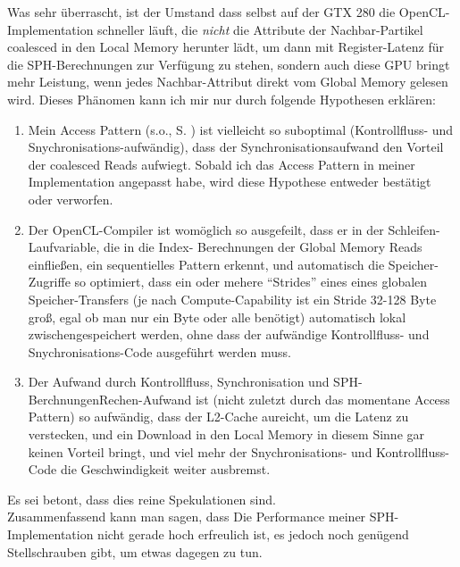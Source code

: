 	Was sehr überrascht, ist der Umstand dass selbst auf der GTX 280 die OpenCL-Implementation schneller läuft, die 
	\emph{nicht} die Attribute der Nachbar-Partikel coalesced in den Local Memory herunter lädt, um dann 
	mit Register-Latenz für die SPH-Berechnungen zur Verfügung zu stehen, sondern auch diese GPU
	bringt mehr Leistung, wenn jedes Nachbar-Attribut direkt vom Global Memory gelesen wird.
	Dieses Phänomen kann ich mir nur durch folgende Hypothesen erklären:
	\begin{enumerate}
		\item Mein Access Pattern (s.o., S. \pageref{enum:goswamiAccessPattern}) ist vielleicht so suboptimal
		(Kontrollfluss- und Snychronisations-aufwändig), dass
		der Synchronisationsaufwand den Vorteil der coalesced Reads aufwiegt. 
		Sobald ich das Access Pattern in meiner Implementation angepasst habe, wird diese Hypothese
		entweder bestätigt oder verworfen.
		\item Der OpenCL-Compiler ist womöglich so ausgefeilt, dass er in der Schleifen-Laufvariable, die in die Index-
		Berechnungen der Global Memory Reads einfließen, ein sequentielles Pattern erkennt, und automatisch
		die Speicher-Zugriffe so optimiert, dass ein oder mehere "`Strides"' eines eines globalen Speicher-Transfers
		(je nach Compute-Capability ist ein Stride 32-128 Byte groß, egal ob man nur ein Byte oder alle benötigt) 
		automatisch lokal zwischengespeichert werden, ohne dass der aufwändige Kontrollfluss- und Snychronisations-Code 
		ausgeführt werden muss.
		\item Der Aufwand durch Kontrollfluss, Synchronisation und SPH-BerchnungenRechen-Aufwand ist 
		(nicht zuletzt durch das momentane Access Pattern) so
		aufwändig, dass der L2-Cache aureicht, um die Latenz zu verstecken, und ein Download in den Local Memory
		in diesem Sinne	gar keinen Vorteil bringt, und viel mehr der Snychronisations- und Kontrollfluss-Code
		die Geschwindigkeit weiter ausbremst.
	\end{enumerate}
	Es sei betont, dass dies reine Spekulationen sind.\\
	
	


	
	
	Zusammenfassend kann man sagen, dass Die Performance meiner SPH-Implementation nicht gerade hoch erfreulich ist, 
	es jedoch noch genügend Stellschrauben gibt, um etwas dagegen zu tun.\\
	
